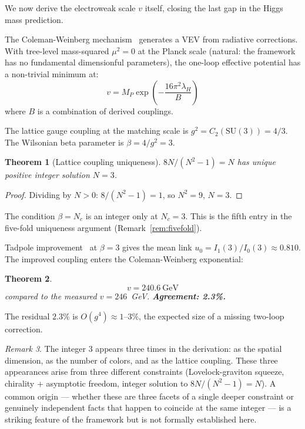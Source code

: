 \documentclass[11pt,letterpaper]{article}
\newtheorem{theorem}{Theorem}
\theoremstyle{remark}
\newtheorem{remark}[theorem]{Remark}
\begin{document}
We now derive the electroweak scale $v$ itself, closing the last gap
in the Higgs mass prediction.

The Coleman-Weinberg mechanism~\cite{ColemanWeinberg} generates a VEV
from radiative corrections. With tree-level mass-squared $\mu^2 = 0$
at the Planck scale (natural: the framework has no fundamental
dimensionful parameters), the one-loop effective potential has a
non-trivial minimum at:
\[
  v = M_P \exp\!\left(-\frac{16\pi^2 \lambda_H}{B}\right)
\]
where $B$ is a combination of derived couplings.

The lattice gauge coupling at the matching scale is $g^2 =
C_2(\mathrm{SU}(3)) = 4/3$. The Wilsonian beta parameter is
$\beta = 4/g^2 = 3$.

\begin{theorem}[Lattice coupling uniqueness]
\label{thm:beta_integer}
$8N/(N^2 - 1) = N$ has unique positive integer solution $N = 3$.
\end{theorem}

\begin{proof}
Dividing by $N > 0$: $8/(N^2 - 1) = 1$, so $N^2 = 9$, $N = 3$.
\end{proof}

\noindent The condition $\beta = N_c$ is an integer only at
$N_c = 3$. This is the fifth entry in the five-fold uniqueness
argument (Remark~\ref{rem:fivefold}).

Tadpole improvement~\cite{LepageMackenzie} at $\beta = 3$ gives the
mean link $u_0 = I_1(3)/I_0(3) \approx 0.810$. The improved coupling
enters the Coleman-Weinberg exponential:

\begin{theorem}
\label{thm:ewscale}
\[
  v = 240.6~\mathrm{GeV}
\]
compared to the measured $v = 246$~GeV. \textbf{Agreement: 2.3\%.}
\end{theorem}

\noindent The residual $2.3\%$ is $O(g^4) \approx 1$--$3\%$, the
expected size of a missing two-loop correction.

\begin{remark}
The integer $3$ appears three times in the derivation: as the spatial
dimension, as the number of colors, and as the lattice coupling.
These three appearances arise from three different constraints
(Lovelock-graviton squeeze, chirality $+$ asymptotic freedom, integer
solution to $8N/(N^2{-}1) = N$). A common origin — whether these are
three facets of a single deeper constraint or genuinely independent
facts that happen to coincide at the same integer — is a striking
feature of the framework but is not formally established here.
\end{remark}
\end{document}

